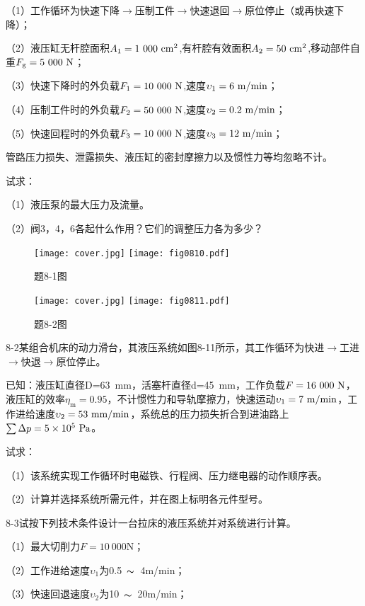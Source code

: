 （1）工作循环为快速下降$\rightarrow $压制工件$\rightarrow $快速退回$\rightarrow $原位停止（或再快速下降）；

（2）液压缸无杆腔面积$A_\text{1}=1\ 000\ \rm cm^2$,有杆腔有效面积$A_\text{2}=50\ \rm cm^2$,移动部件自重$F_\text{g}=5\ 000\ \rm N$；

（3）快速下降时的外负载$F_\text{1}=10\ 000\ \rm N$,速度$\upsilon_\text{1}=6\ \rm m/min$；

（4）压制工件时的外负载$F_\text{2}=50\ 000\ \rm N$,速度$\upsilon_\text{2}=0.2\ \rm m/min$；

（5）快速回程时的外负载$F_\text{3}=10\ 000\ \rm N$,速度$\upsilon_\text{3}=12\ \rm m/min$；

管路压力损失、泄露损失、液压缸的密封摩擦力以及惯性力等均忽略不计。

试求：

（1）液压泵的最大压力及流量。

（2）阀3，4，6各起什么作用？它们的调整压力各为多少？
\begin{figure}
\centering
\ifOpenSource
\texttt{[image: cover.jpg]}
\else
\texttt{[image: fig0810.pdf]}
\fi
\caption{题8-1图}
\label{fig:fig0810}
\end{figure}

\begin{figure}
\centering
\ifOpenSource
\texttt{[image: cover.jpg]}
\else
\texttt{[image: fig0811.pdf]}
\fi
\caption{题8-2图}
\label{fig:fig0811}
\end{figure}

8-2\qquad 某组合机床的动力滑台，其液压系统如图8-11所示，其工作循环为快进$\rightarrow $工进$\rightarrow $快退$\rightarrow $原位停止。

已知：液压缸直径D=63\ mm，活塞杆直径d=45\ mm，工作负载$F=16\ 000\ \rm N$，液压缸的效率$\eta_\text{m}=0.95$，不计惯性力和导轨摩擦力，快速运动$\upsilon_\text{1}=7\ \rm m/min$，工作进给速度$\upsilon_\text{2}=53\ \rm mm/min$，系统总的压力损失折合到进油路上$\sum \Delta p=5\times10^5\ \rm Pa$。

试求：

（1）该系统实现工作循环时电磁铁、行程阀、压力继电器的动作顺序表。

（2）计算并选择系统所需元件，并在图上标明各元件型号。

8-3\qquad 试按下列技术条件设计一台拉床的液压系统并对系统进行计算。

（1）最大切削力$F=10\ 000$N；

（2）工作进给速度$\upsilon_\text{1}$为0.5\ $\thicksim$\ 4m/min；

（3）快速回退速度$\upsilon_\text{2}$为10\ $\thicksim$\ 20m/min；

